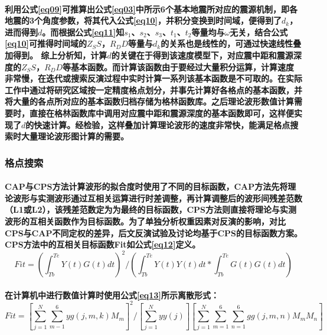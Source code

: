 \documentclass[a4paper,12pt,single,pdftex]{scrartcl}
\begin{document}
\label{ID_1685002795}\paragraph{利用公式\ref{eq09}可推算出公式\ref{eq03}中所示6个基本地震所对应的震源机制，即各地震的3个角度参数，将其代入公式\ref{eq10}，并积分变换到时间域，便得到了$d_k$，进而得到$d$。而根据公式\ref{eq11}知$s_1$、$s_2$、$s_3$、$t_1$、$t_2$等量均与$\omega$无关，结合公式\ref{eq10}可推得时间域的$Z_SS$，$R_DD$等量与$d_k$的关系也是线性的，可通过快速线性叠加得到。
综上分析知，计算$d$的关键在于得到该速度模型下，对应震中距和震源深度的$Z_SS$，$R_DD$等基本函数。而计算该函数由于要经过大量积分运算，计算速度非常慢，在迭代或搜索反演过程中实时计算一系列该基本函数是不可取的。在实际工作中通过将研究区域按一定精度格点划分，并事先计算好各格点的基本函数，并将大量的各点所对应的基本函数归档存储为格林函数库。之后理论波形数值计算需要时，直接在格林函数库中调用对应震中距和震源深度的基本函数即可，这样便实现了$d$的快速计算。经检验，这样叠加计算理论波形的速度非常快，能满足格点搜索时大量理论波形图计算的需要。}

\label{ID_424266573}\subsubsection{格点搜索}

\label{ID_1321964956}\paragraph{CAP与CPS方法计算波形的拟合度时使用了不同的目标函数，CAP方法先将理论波形与实测波形通过互相关运算进行时差调整，再计算调整后的波形间残差范数（L1或L2）\citep{Zhao1994}，该残差范数定为为最终的目标函数，CPS方法则直接将理论与实测波形的互相关函数作为目标函数。为了单独分析权重因素对反演的影响，对比CPS与CAP不同定权的差异，后文反演试验及讨论均基于CPS的目标函数方案。CPS方法中的互相关目标函数Fit如公式\ref{eq12}定义。
\begin{equation}
\label{eq12}
Fit=(\int_{Tb}^{Te}Y(t)G(t)dt)^2/(\int_{Tb}^{Te}Y(t)Y(t)dt*\int_{Tb}^{Te}G(t)G(t)dt)
\end{equation}}

\label{ID_143427010}\paragraph{在计算机中进行数值计算时使用公式\ref{eq13}所示离散形式：
\begin{equation}
\label{eq13}
Fit=[\sum_{j=1}^{N}\sum_{m-1}^{6}yg(j,m,k)M_m]^2/{[\sum_{j=1}^{N}yy(j)][\sum_{j=1}^{N}\sum_{m=1}^{6}\sum_{n=1}^{6}gg(j,m,n)M_mM_n]}
\end{equation}}
\end{document}
